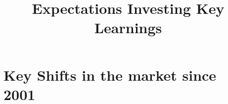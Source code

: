 \documentclass[english,titlepage]{article}
\begin{document}
\title{\textbf{Expectations Investing Key Learnings} \\ 
\date{}
}
\maketitle
\section{Key Shifts in the market since 2001}
\end{document}
